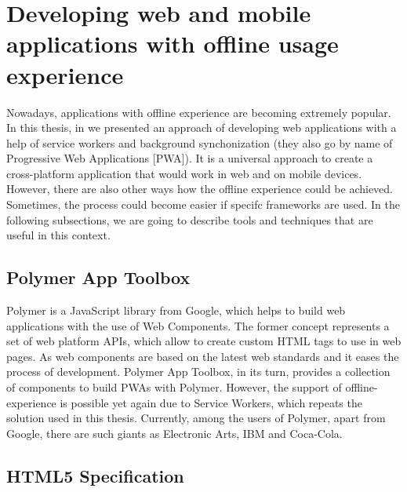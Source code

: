 \section{Developing web and mobile applications with offline usage experience}

Nowadays, applications with offline experience are becoming extremely popular. In this thesis, in  we presented an approach of developing web applications with a help of service workers and background synchonization (they also go by name of Progressive Web Applications [PWA]). It is a universal approach to create a cross-platform application that would work in web and on mobile devices. However, there are also other ways how the offline experience could be achieved. Sometimes, the process could become easier if specifc frameworks are used. In the following subsections, we are going to describe tools and techniques that are useful in this context. 


\subsection*{Polymer App Toolbox}

Polymer is a JavaScript library from Google, which helps to build web applications with the use of Web Components. The former concept represents a set of web platform APIs, which allow to create custom HTML tags to use in web pages\cite{16}. As web components are based on the latest web standards and it eases the process of development. Polymer App Toolbox, in its turn, provides a collection of components to build PWAs with Polymer. However, the support of offline-experience is possible yet again due to Service Workers\cite{18}, which repeats the solution used in this thesis. Currently, among the users of Polymer, apart from Google, there are such giants as Electronic Arts, IBM and Coca-Cola\cite{17}.

\subsection*{HTML5 Specification}


